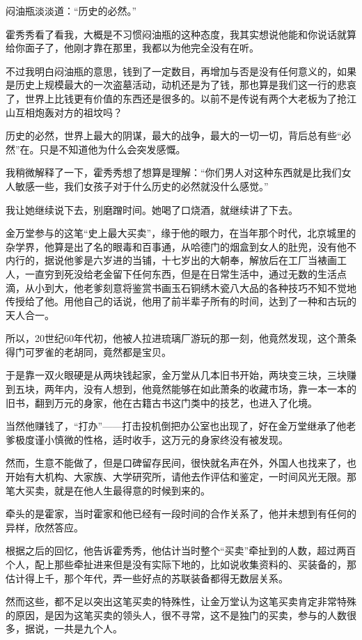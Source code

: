 闷油瓶淡淡道：“历史的必然。”

霍秀秀看了看我，大概是不习惯闷油瓶的这种态度，我其实想说他能和你说话就算给你面子了，他刚才靠在那里，我都以为他完全没有在听。

不过我明白闷油瓶的意思，钱到了一定数目，再增加与否是没有任何意义的，如果是历史上规模最大的一次盗墓活动，动机还是为了钱，那也算是我们这一行的悲哀了，世界上比钱更有价值的东西还是很多的。以前不是传说有两个大老板为了抢江山互相炮轰对方的祖坟吗？

历史的必然，世界上最大的阴谋，最大的战争，最大的一切一切，背后总有些“必然”在。只是不知道他为什么会突发感慨。

我稍微解释了一下，霍秀秀想了想算是理解：“你们男人对这种东西就是比我们女人敏感一些，我们女孩子对于什么历史的必然就没什么感觉。”

我让她继续说下去，别磨蹭时间。她喝了口烧酒，就继续讲了下去。

金万堂参与的这笔“史上最大买卖”，缘于他的眼力，在当年那个时代，北京城里的杂学界，他算是出了名的眼毒和百事通，从哈德门的烟盒到女人的肚兜，没有他不内行的，据说他爹是六岁进的当铺，十七岁出的大朝奉，解放后在工厂当裱画工人，一直穷到死没给老金留下任何东西，但是在日常生活中，通过无数的生活点滴，从小到大，他老爹刻意将鉴赏书画玉石铜绣木瓷八大品的各种技巧不知不觉地传授给了他。用他自己的话说，他用了前半辈子所有的时间，达到了一种和古玩的天人合一。

所以，20世纪60年代初，他被人拉进琉璃厂游玩的那一刻，他竟然发现，这个萧条得门可罗雀的老胡同，竟然都是宝贝。

于是靠一双火眼硬是从两块钱起家，金万堂从几本旧书开始，两块变三块，三块赚到五块，两年内，没有人想到，他竟然能够在如此萧条的收藏市场，靠一本一本的旧书，翻到万元的身家，他在古籍古书这门类中的技艺，也进入了化境。

当然他赚钱了，“打办”——打击投机倒把办公室也出现了，好在金万堂继承了他老爹极度谨小慎微的性格，适时收手，这万元的身家终没有被发现。

然而，生意不能做了，但是口碑留存民间，很快就名声在外，外国人也找来了，也开始有大机构、大家族、大学研究所，请他去作评估和鉴定，一时间风光无限。那笔大买卖，就是在他人生最得意的时候到来的。

牵头的是霍家，当时霍家和他已经有一段时间的合作关系了，他并未想到有任何的异样，欣然答应。

根据之后的回忆，他告诉霍秀秀，他估计当时整个“买卖”牵扯到的人数，超过两百个人，配上那些牵扯进来但是没有实际下地的，比如说收集资料的、买装备的，那估计得上千，那个年代，弄一些好点的苏联装备都得无数层关系。

然而这些，都不足以突出这笔买卖的特殊性，让金万堂认为这笔买卖肯定非常特殊的原因，是因为这笔买卖的领头人，很不寻常，这不是独门的买卖，参与的人数很多，据说，一共是九个人。


